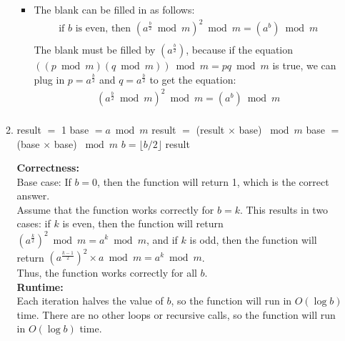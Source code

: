 \documentclass{article}
\begin{document}
\begin{enumerate}
\begin{enumerate}
\begin{itemize}
            \item The blank can be filled in as follows:
            \begin{align*}
                \text{if $b$ is even, then }(a^{\frac{b}{2}}\bmod m)^2 \bmod m = (a^b) \bmod m \\
            \end{align*}
            The blank must be filled by $(a^{\frac{b}{2}})$, because if the equation $((p\bmod m)(q\bmod m))\bmod m = pq\bmod m$ is true, we can plug in $p=a^{\frac{b}{2}}$ and $q=a^{\frac{b}{2}}$ to get the equation:
            \begin{align*}
                (a^{\frac{b}{2}}\bmod m)^2 \bmod m = (a^b) \bmod m \\
            \end{align*}
        \end{itemize}
        \pagebreak
        \item \begin{algorithm}
            \begin{algorithmic}[1]
                    \State result $=$ 1
                    \State base $= a \bmod m$
                            \State result $=$ (result $\times$ base) $\bmod m$
                        \EndIf
                        \State base $=$ (base $\times$ base) $\bmod m$
                        \State $b = \lfloor b / 2 \rfloor$
                    \EndWhile
                    \State \Return result
                \EndFunction
            \end{algorithmic}
        \end{algorithm}
        \textbf{Correctness:} \\
        Base case: If $b=0$, then the function will return 1, which is the correct answer. \\
        Assume that the function works correctly for $b=k$. This results in two cases: if $k$ is even, then the function will return $(a^{\frac{k}{2}})^2 \bmod m = a^k \bmod m$, and if $k$ is odd, then the function will return $(a^{\frac{k-1}{2}})^2 \times a \bmod m = a^k \bmod m$. \\
        Thus, the function works correctly for all $b$. \\
        \textbf{Runtime:} \\
        Each iteration halves the value of $b$, so the function will run in $O(\log b)$ time. There are no other loops or recursive calls, so the function will run in $O(\log b)$ time. \\

\end{enumerate}
\end{enumerate}
\end{document}
